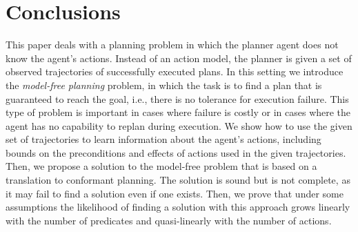 \documentclass[letterpaper]{article}
\begin{document}
\section{Conclusions}
This paper deals with a planning problem in which the planner agent does not know the agent's actions. Instead of an action model, the planner is given a set of observed trajectories of successfully executed plans. 
In this setting we introduce the {\em model-free planning} problem, in which the task is to find a plan that is guaranteed to reach the goal, i.e., there is no tolerance for execution failure. This type of problem is important in cases where failure is costly or in cases where the agent has no capability to replan during execution. 
We show how to use the given set of trajectories to learn
information about the agent's actions, including bounds on the preconditions and effects of actions used in the given trajectories. Then, we propose a solution to the model-free problem that is based on a translation to conformant planning. The solution is sound but is not complete, as it may fail to find a solution even if one exists. 
Then, we prove that under some assumptions the likelihood of finding a solution with this approach grows linearly with the number of predicates and quasi-linearly with the number of actions. 



\newpage



\end{document}
